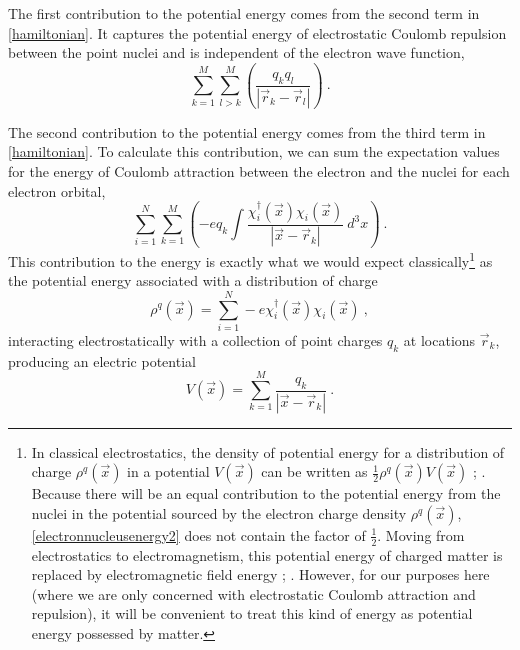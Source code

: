 \documentclass[onecolumn,secnumarabic,amsmath,amssymb,balancelastpage,nofootinbib]{article}
\begin{document}
The first contribution to the potential energy comes from the second term in \eqref{hamiltonian}.  It captures the potential energy of electrostatic Coulomb repulsion between the point nuclei and is independent of the electron wave function,
\begin{equation}
\sum_{k=1}^{M}\sum_{l>k}^{M} \left(\frac{q_k q_l}{|\vec{r}_k-\vec{r}_l|}\right)
\ .
\label{nucleusnucleusenergy}
\end{equation}

The second contribution to the potential energy comes from the third term in \eqref{hamiltonian}.  To calculate this contribution, we can sum the expectation values for the energy of Coulomb attraction between the electron and the nuclei for each electron orbital,
\begin{equation}
\sum_{i=1}^{N}\sum_{k=1}^{M}\left(-e q_k \int{ \frac{\chi_i^{\dagger}(\vec{x})\chi_i(\vec{x})}{|\vec{x}-\vec{r}_k|}\  d^3 x}\right)
\ .
\label{electronnucleusenergy}
\end{equation}
This contribution to the energy is exactly what we would expect classically\footnote{In classical electrostatics, the density of potential energy for a distribution of charge $\rho^q(\vec{x})$ in a potential $V(\vec{x})$ can be written as $\frac{1}{2}\rho^q(\vec{x}) V(\vec{x})$ \cite[sec.\ 1.11]{jackson}; \cite[sec.\ 2.4]{griffiths}.  Because there will be an equal contribution to the potential energy from the nuclei in the potential sourced by the electron charge density $\rho^q(\vec{x})$, \eqref{electronnucleusenergy2} does not contain the factor of $\frac{1}{2}$.  Moving from electrostatics to electromagnetism, this potential energy of charged matter is replaced by electromagnetic field energy \cite[ch.\ 5]{lange}; \cite[sec.\ 2.4.4]{griffiths}.  However, for our purposes here (where we are only concerned with electrostatic Coulomb attraction and repulsion), it will be convenient to treat this kind of energy as potential energy possessed by matter.} as the potential energy associated with a distribution of charge
\begin{equation}
\rho^q(\vec{x})=\sum_{i=1}^{N}-e\chi_i^{\dagger}(\vec{x})\chi_i(\vec{x})
\ ,
\label{chargedensity1}
\end{equation}
interacting electrostatically with a collection of point charges $q_k$ at locations $\vec{r}_k$, producing an electric potential
\begin{equation}
V(\vec{x})=\sum_{k=1}^{M}\frac{q_k}{|\vec{x}-\vec{r}_k|} 
\ .
\label{potentialfromnuclei}
\end{equation}
\end{document}
